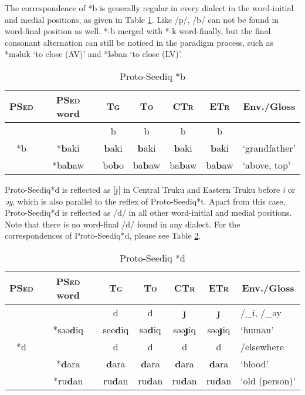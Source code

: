 \documentclass[12pt]{article}
\newcommand{\psed}{\textsc{PSed}\xspace}
\newcommand{\psedf}{Proto-Seediq\xspace}
\newcommand{\stg}{\textsc{Tg}\xspace}
\newcommand{\sto}{\textsc{To}\xspace}
\newcommand{\sctr}{\textsc{CTr}\xspace}
\newcommand{\sctrf}{Central Truku\xspace}
\newcommand{\setr}{\textsc{ETr}\xspace}
\newcommand{\setrf}{Eastern Truku\xspace}
\begin{document}
The correspondence of *b is generally regular in every dialect in the word-initial and medial positions, as given in Table \ref{tab:b}. Like /p/, /b/ can not be found in word-final position as well. *-b merged with *-k word-finally, but the final consonant alternation can still be noticed in the paradigm process, such as *məluk `to close (AV)' and *ləban `to close (LV)'. 

\begin{table}[!htbp]
\centering
\caption{Proto-Seediq *b}
\label{tab:b}
\begin{tabular}{c|c|cccc|l}
\textbf{\psed} & \textbf{\psed word}      & \textbf{\stg} & \textbf{\sto} & \textbf{\sctr} & \textbf{\setr} & \multicolumn{1}{c}{\textbf{Env./Gloss}} \\ \hline
\multirow{3}{*}{*b} & & b    & b    & b     & b     &                          \\ \cline{2-7}
                    & *\textbf{b}aki & \textbf{b}aki & \textbf{b}aki & \textbf{b}aki & \textbf{b}aki & `grandfather'         \\
                    & *ba\textbf{b}aw & bo\textbf{b}o & ba\textbf{b}aw & ba\textbf{b}aw & ba\textbf{b}aw & `above, top'      \\ \hline
\end{tabular}
\end{table}

\psedf *d is reflected as [ɟ] in \sctrf and \setrf before \textit{i} or \textit{əy}, which is also parallel to the reflex of \psedf *t. Apart from this case, \psedf *d is reflected as /d/ in all other word-initial and medial positions. Note that there is no word-final /d/ found in any dialect. For the correspondences of \psedf *d, please see Table \ref{tab:d}. 

\begin{table}[!htbp]
\centering
\caption{Proto-Seediq *d}
\label{tab:d}
\begin{tabular}{c|c|cccc|l}
\textbf{\psed} & \textbf{\psed word}      & \textbf{\stg} & \textbf{\sto} & \textbf{\sctr} & \textbf{\setr} & \multicolumn{1}{c}{\textbf{Env./Gloss}} \\ \hline
\multirow{5}{*}{*d} &  & d    & d    & ɟ     & ɟ     & /\_i, /\_əy                \\ \cline{2-7}
                    & *səə\textbf{d}iq & see\textbf{d}iq & sə\textbf{d}iq & səə\textbf{ɟ}iq & səə\textbf{ɟ}iq & `human'      \\ \cline{2-7}
                    & & d    & d    & d     & d     & /elsewhere               \\ \cline{2-7}
                    & *\textbf{d}ara & \textbf{d}ara & \textbf{d}ara & \textbf{d}ara & \textbf{d}ara & `blood'               \\ 
                    & *ru\textbf{d}an & ru\textbf{d}an & ru\textbf{d}an & ru\textbf{d}an & ru\textbf{d}an & `old (person)'   \\ \hline
\end{tabular}
\end{table}
\end{document}
